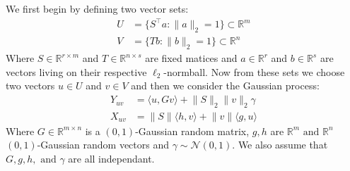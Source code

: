 We first begin by defining two vector sets:
\begin{align*}
    U &= \{ S^{\top}a : \lVert a \rVert_2 = 1 \} \subset \mathbb{R}^m \\
    V &= \{ Tb : \lVert b \rVert_2 = 1\} \subset \mathbb{R}^n 
\end{align*}
Where $S \in \mathbb{R}^{r \times m}$ and $T \in \mathbb{R}^{n \times s}$ are fixed matices and $a \in \mathbb{R}^{r}$
and $b \in \mathbb{R}^{s}$ are vectors living on their respective $\ell_2$-normball. Now from these sets we choose two
vectors $u \in U$ and $v \in V$ and then we consider the Gaussian process:
\begin{align*}
    Y_{uv} &= \langle u, Gv \rangle + \lVert S \rVert_2 \lVert v \rVert_2 \gamma \\
    X_{uv} &= \lVert S \rVert \langle h, v \rangle + \lVert v \rVert \langle g, u \rangle
\end{align*}
Where $G \in \mathbb{R}^{m \times n}$ is a $(0, 1)$-Gaussian random matrix, $g, h$ are $\mathbb{R}^{m} \text{ and }
\mathbb{R}^{n}$ $(0, 1)$-Gaussian random vectors and $\gamma \sim \mathcal{N}(0, 1)$. We also assume that $G, g, h,
\text{ and } \gamma$ are all independant. \\

